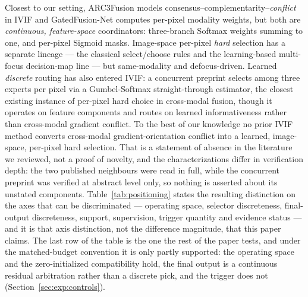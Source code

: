 \documentclass[pdflatex,sn-mathphys-num]{sn-jnl}
\theoremstyle{thmstyleone}%
\theoremstyle{thmstyletwo}%
\theoremstyle{thmstylethree}%
\begin{document}
Closest to our setting, ARC3Fusion \cite{tian2026adaptive} models consensus--complementarity--\emph{conflict} in IVIF and GatedFusion-Net \cite{brenner2026gatedfusion} computes per-pixel modality weights, but both are \emph{continuous, feature-space} coordinators: three-branch Softmax weights summing to one, and per-pixel Sigmoid masks. Image-space per-pixel \emph{hard} selection has a separate lineage --- the classical select/choose rules \cite{burt1993enhanced,zhang1999categorization,piella2003general} and the learning-based multi-focus decision-map line \cite{ma2021endtoend} --- but same-modality and defocus-driven. Learned \emph{discrete} routing has also entered IVIF: a concurrent preprint \cite{ma2026dynamic} selects among three experts per pixel via a Gumbel-Softmax straight-through estimator, the closest existing instance of per-pixel hard choice in cross-modal fusion, though it operates on feature components and routes on learned informativeness rather than cross-modal gradient conflict. To the best of our knowledge no prior IVIF method converts cross-modal gradient-orientation conflict into a learned, image-space, per-pixel hard selection. That is a statement of absence in the literature we reviewed, not a proof of novelty, and the characterizations differ in verification depth: the two published neighbours were read in full, while the concurrent preprint was verified at abstract level only, so nothing is asserted about its unstated components. Table~\ref{tab:positioning} states the resulting distinction on the axes that can be discriminated --- operating space, selector discreteness, final-output discreteness, support, supervision, trigger quantity and evidence status --- and it is that axis distinction, not the difference magnitude, that this paper claims. The last row of the table is the one the rest of the paper tests, and under the matched-budget convention it is only partly supported: the operating space and the zero-initialized compatibility hold, the final output is a continuous residual arbitration rather than a discrete pick, and the trigger does not (Section~\ref{sec:exp:controls}).
\end{document}
